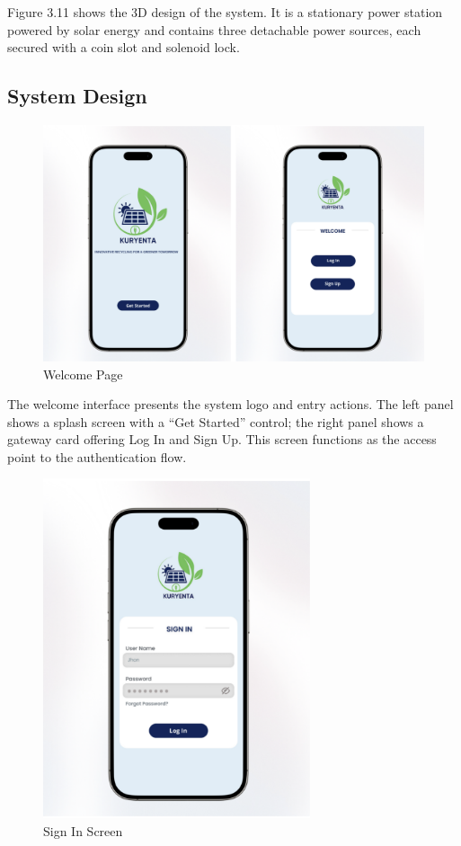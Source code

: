 {Figure 3.11 shows the 3D design of the system. It is a stationary power station powered by solar energy and contains three detachable power sources, each secured with a coin slot and solenoid lock.
  
  \subsection{System Design}
  
     \begin{figure}[H]
  	\centering
  	\caption{Welcome Page}
  	\label{fig:welcome}
  	\includegraphics[width=1\textwidth]{figures/welcome.png}
  \end{figure}
  
  The welcome interface presents the system logo and entry actions. The left panel shows a splash screen with a “Get Started” control; the right panel shows a gateway card offering Log In and Sign Up. This screen functions as the access point to the authentication flow.
  
   \begin{figure}[H]
  	\centering
  	\caption{Sign In Screen}
  	\label{fig:signin}
  	\includegraphics[width=0.7\textwidth]{figures/signin.png}
  \end{figure}
  
}
